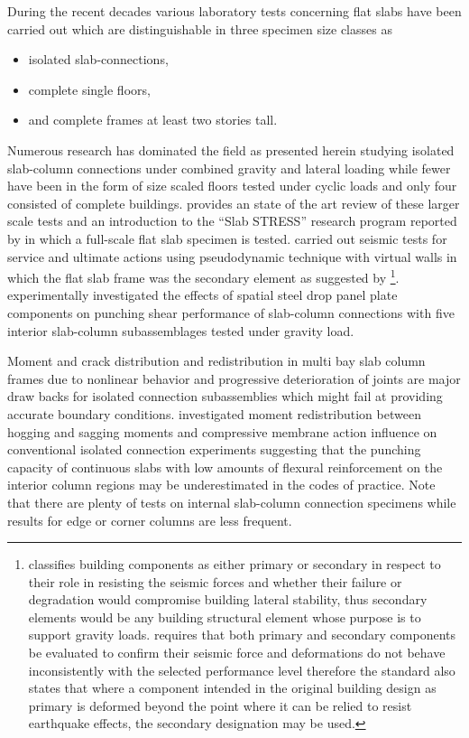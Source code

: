 During the recent decades various laboratory tests concerning flat slabs have been carried out which are distinguishable in three specimen size classes as \begin{itemize}\item isolated slab-connections, \item complete single floors, \item and complete frames at least two stories tall. \end{itemize}
Numerous research has dominated the field as presented herein studying isolated slab-column connections under combined gravity and lateral loading\citep{dovich2005,drakatos2016,hawkins1979,hueste2007,kang2006,megally2000,pan1989,robertson2002,setiawan2019,tian2008,andre2016} while fewer have been in the form of size scaled floors tested under cyclic loads\citep{hwang1993,hwang2000,rha2014} and only four consisted of complete buildings\citep{coronelli2021,fick2017,moehle1984,kang2004}. \cite{coronelli2020} provides an state of the art review of these larger scale tests and an introduction to the ``Slab STRESS'' research program reported by \cite{coronelli2021} in which a full-scale flat slab specimen is tested. \cite{coronelli2021} carried out seismic tests for service and ultimate actions using pseudodynamic technique with virtual walls in which the flat slab frame was the secondary element as suggested by \cite{asce4117,fema356}\footnote{\cite{asce4117} classifies building components as either primary or secondary in respect to their role in resisting the seismic forces and whether their failure or degradation would compromise building lateral stability, thus secondary elements would be any building structural element whose purpose is to support gravity loads. \cite{asce4117} requires that both primary and secondary components be evaluated to confirm their seismic force and deformations do not behave inconsistently with the selected performance level therefore the standard also states that where a component intended in the original building design as primary is deformed beyond the point where it can be relied to resist earthquake effects, the secondary designation may be used.}. \cite{chen2023} experimentally investigated the effects of spatial steel drop panel plate components on punching shear performance of slab-column connections with five interior slab-column subassemblages tested under gravity load.

Moment and crack distribution and redistribution in multi bay slab column frames due to nonlinear behavior and progressive deterioration of joints are major draw backs for isolated connection subassemblies which might fail at providing accurate boundary conditions\citep{einpaul2015,einpaul2016}. \cite{einpaul2015} investigated moment redistribution between hogging and sagging moments and compressive membrane action influence on conventional isolated connection experiments suggesting that the punching capacity of continuous slabs with low amounts of flexural reinforcement on the interior column regions may be underestimated in the codes of practice. Note that there are plenty of tests on internal slab-column connection specimens while results for edge or corner columns are less frequent. 

